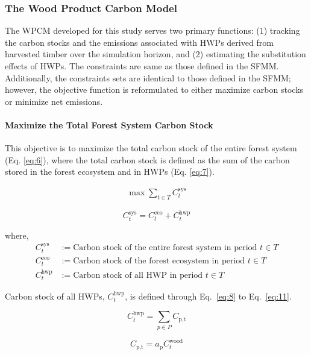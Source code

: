 \documentclass[preprint,12pt,authoryear]{elsarticle}
\begin{document}
\begin{linenumbers}
\subsubsection{The Wood Product Carbon Model}
\label{sec: wood model}
The \ac{WPCM} developed for this study serves two primary functions: (1) tracking the carbon stocks and the emissions associated with \acp{HWP} derived from harvested timber over the simulation horizon, and (2) estimating the substitution effects of  \acp{HWP}. The constraints are same as those defined in the \ac{SFMM}. Additionally, the constraints sets are identical to those defined in the \ac{SFMM}; however, the objective function is reformulated to either maximize carbon stocks or minimize net emissions.

\paragraph{Maximize the Total Forest System Carbon Stock}
This objective is to maximize the total carbon stock of the entire forest system (Eq. \ref{eq:6}), where the total carbon stock is defined as the sum of the carbon stored in the forest ecosystem and in \acp{HWP} (Eq. \ref{eq:7}). 

\begin{align}
\max \sum_{t \in T} C_t^{\text{sys}}
\label{eq:6}
\end{align}

\begin{equation}
C_t^{\text{sys}}= C_t^{\text{eco}}+ C_t^{\text{hwp}}
\label{eq:7}
\end{equation}

where,
\begin{align*}
C^{\text{sys}}_t &:= \text{Carbon stock of the entire forest system in period } t \in T\\
C^{\text{eco}}_t &:= \text{Carbon stock of the forest ecosystem in period } t \in T\\
C^{\text{hwp}}_t &:= \text{Carbon stock of all {HWP} in period } t \in T
\end{align*}

Carbon stock of all \acp{HWP}, $C^{\text{hwp}}_t$, is defined through Eq.~\ref{eq:8} to Eq.~\ref{eq:11}.


\begin{equation}
C^{\text{hwp}}_t = \sum_{p \in P}C_{\text{p,t}}
\label{eq:8}
\end{equation}

\begin{equation}
C_{\text{p,t}} = a_{\text{p}}C_t^{\text{wood}}
\label{eq:9}
\end{equation}


\end{linenumbers}
\end{document}
